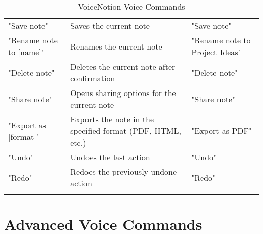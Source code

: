 \begin{longtable}{p{}p{}p{}}
"Save note" & Saves the current note & "Save note" \\
"Rename note to [name]" & Renames the current note & "Rename note to Project Ideas" \\
"Delete note" & Deletes the current note after confirmation & "Delete note" \\
"Share note" & Opens sharing options for the current note & "Share note" \\
"Export as [format]" & Exports the note in the specified format (PDF, HTML, etc.) & "Export as PDF" \\
\midrule

"Undo" & Undoes the last action & "Undo" \\
"Redo" & Redoes the previously undone action & "Redo" \\

\bottomrule
\caption{VoiceNotion Voice Commands}
\label{tab:voice_commands}
\end{longtable}

\section{Advanced Voice Commands}

